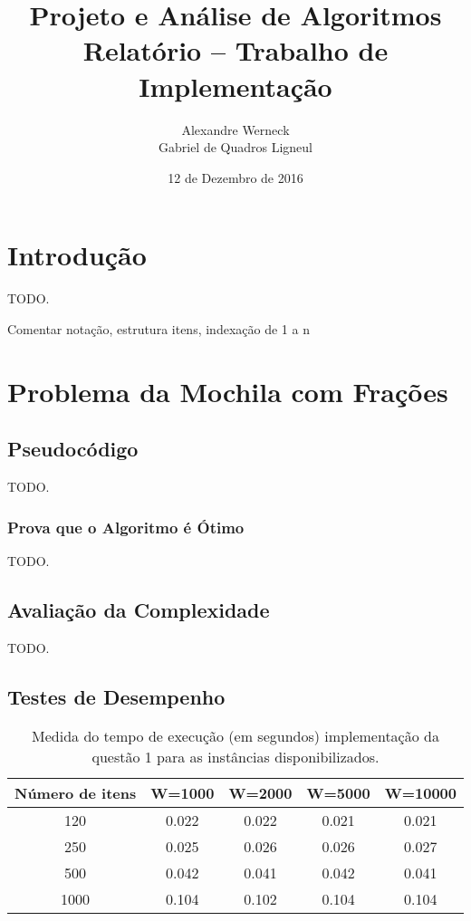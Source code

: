 \documentclass[a4paper]{article}
\title{Projeto e Análise de Algoritmos\\Relatório -- Trabalho de Implementação}
\author{Alexandre Werneck\\Gabriel de Quadros Ligneul}
\date{12 de Dezembro de 2016}
\begin{document}
\maketitle

\section{Introdução}

TODO.

Comentar notação, estrutura itens, indexação de 1 a n

\section{Problema da Mochila com Frações}

\subsection{Pseudocódigo}

TODO.

\subsubsection{Prova que o Algoritmo é Ótimo}

TODO.

\subsection{Avaliação da Complexidade}

TODO.

\subsection{Testes de Desempenho}

\begin{table}[H]
\centering
\begin{tabular}{c|c|c|c|c}
Número de itens & W=1000 & W=2000 & W=5000 & W=10000 \\
\hline
120 & 0.022 & 0.022 & 0.021 & 0.021 \\
250 & 0.025 & 0.026 & 0.026 & 0.027 \\
500 & 0.042 & 0.041 & 0.042 & 0.041 \\
1000 & 0.104 & 0.102 & 0.104 & 0.104 \\
\end{tabular}
\caption{Medida do tempo de execução (em segundos) implementação da questão 1 para as instâncias disponibilizados.}
\label{tab:q1:bench}
\end{table}
\end{document}
